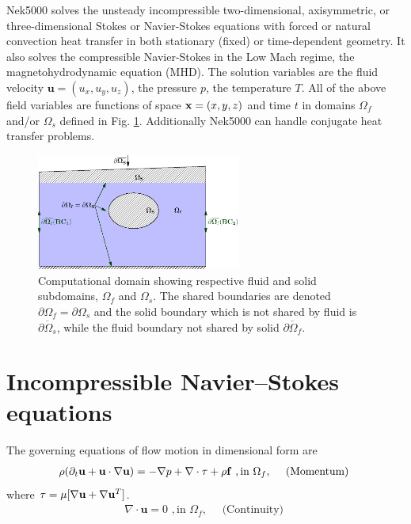 Nek5000 solves the unsteady incompressible two-dimensional,
axisymmetric, or three-dimensional Stokes or Navier-Stokes
equations with forced or natural convection heat transfer in
both stationary (fixed) or time-dependent geometry. It also solves the compressible Navier-Stokes in the Low Mach regime, the magnetohydrodynamic equation (MHD).
The solution variables are the fluid velocity
\(\mathbf u=(u_{x},u_{y},u_{z})\), the pressure \(p\),
the temperature \(T\). 
All of the above field variables
are functions of space \({\bf x}=(x,y,z)\) and time \(t\)
in domains \(\Omega_f\) and/or \(\Omega_s\) defined in Fig. \ref{fig:domains}.
Additionally Nek5000 can handle conjugate heat transfer problems.

\begin{figure}
\centering
\includegraphics[width=0.6\textwidth]{Figs/walls}
\caption{Computational domain showing respective fluid
and solid subdomains, \(\Omega_f\) and \(\Omega_s\). The shared boundaries are denoted \(\partial\Omega_f=\partial\Omega_s\) and the solid boundary which is not shared by fluid is \(\overline{\partial\Omega_s}\), while the fluid boundary not shared by solid \(\overline{\partial\Omega_f}\).}
\label{fig:domains}
\end{figure}

\section{Incompressible Navier--Stokes equations}
%
The governing equations of flow motion in dimensional form are
\begin{eqnarray}\label{eq:ns_momentum}
\rho(\partial_{t} \mathbf u +\mathbf u \cdot \nabla \mathbf u) = - \nabla p + \nabla \cdot \tau + \rho {\bf f} \,\, , \text{in } \Omega_f , \quad \text{  (Momentum)  } 
\end{eqnarray}
where \( \tau=\mu[\nabla \mathbf{u}+\nabla \mathbf{u}^{T}]\).
\begin{eqnarray}\label{eq:ns_cont}
 \nabla \cdot \mathbf u =0 \,\, , \text{in } \Omega_f, \quad \text{  (Continuity)  }   
\end{eqnarray}

